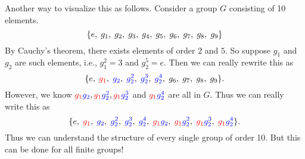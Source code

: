     Another way to visualize this as follows. Consider a group $G$
    consisting of 10 elements. 
    \[
        \{e, \hspace{.1cm}g_1,\hspace{.1cm} g_2,\hspace{.1cm} g_3,\hspace{.1cm} g_4,\hspace{.1cm} g_5,\hspace{.1cm} g_6,\hspace{.1cm} g_7,\hspace{.1cm} g_8,\hspace{.1cm} g_{9}\}
    \]
    By Cauchy's theorem, there exists elements of order $2$ and $5$.
    So suppose $g_1$ and $g_2$ are such elements, i.e., $g_1^2 = 3$
    and $g_2^5 = e$. Then we can really rewrite this as 
    \[
        \{e,\hspace{.1cm} \textcolor{red}{g_1},\hspace{.1cm} \textcolor{blue}{g_2},\hspace{.1cm} \textcolor{blue}{g_2^2},\hspace{.1cm} \textcolor{blue}{g_2^3},\hspace{.1cm} \textcolor{blue}{g_2^4},\hspace{.1cm} g_6,\hspace{.1cm} g_7,\hspace{.1cm} g_8,\hspace{.1cm} g_9\}.   
    \] 
    However, we know $\textcolor{red}{g_1}\textcolor{blue}{g_2}, \textcolor{red}{g_1}\textcolor{blue}{g_2^2}, \textcolor{red}{g_1}\textcolor{blue}{g_2^3}$ and $\textcolor{red}{g_1}\textcolor{blue}{g_2^4}$ are all in $G$. Thus
    we can really write this as 
    \[
        \{e, \hspace{.1cm} \textcolor{red}{g_1},\hspace{.1cm} \textcolor{blue}{g_2},\hspace{.1cm} \textcolor{blue}{g_2^2},\hspace{.1cm} \textcolor{blue}{g_2^3},\hspace{.1cm} \textcolor{blue}{g_2^4}, \hspace{.1cm}\textcolor{red}{g_1}\textcolor{blue}{g_2},\hspace{.1cm} \textcolor{red}{g_1}\textcolor{blue}{g_2^2},\hspace{.1cm} \textcolor{red}{g_1}\textcolor{blue}{g_2^3},\hspace{.1cm} \textcolor{red}{g_1}\textcolor{blue}{g_2^4}\}.
    \] 
    Thus we can understand the structure of every single group of
    order 10. But this can be done for all finite groups!
    
